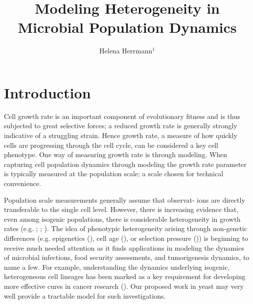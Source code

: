 \documentclass{bioinfo}
\begin{document}

\title[Project Proposal]{\Large{Modeling Heterogeneity in Microbial Population Dynamics}}
\author[Helena Herrmann]{Helena Herrmann$^{1}$}
\address{$^{1}$School of Computing Science, Newcastle University, UK}

\vspace{-3em}
\maketitle

\section{Introduction}

Cell growth rate is an important component of evolutionary fitness and is thus subjected to great selective forces; a reduced growth rate is generally strongly indicative of a struggling strain. Hence growth rate, a measure of how quickly cells are progressing through the cell cycle, can be considered a key cell phenotype. One way of measuring growth rate is through modeling. When capturing cell population dynamics through modeling the growth rate parameter is typically measured at the population scale; a scale chosen for technical convenience. 

Population scale measurements generally assume that observat- ions are directly transferable to the single cell level. However, there is increasing evidence that, even among isogenic populations, there is considerable heterogeneity in growth rates (e.g. \citealp{Pin06}; \citealp{Schmidt12}; \citealp{Levy12}). The idea of phenotypic heterogeneity arising through non-genetic differences (e.g. epigenetics (\citealp{Bird07}), cell age (\citealp{Ginovart11}), or selection pressure (\citealp{Navin11})) is beginning to receive much needed attention as it finds applications in modeling the dynamics of microbial infections, food security assessments, and tumorigenesis dynamics, to name a few.  For example, understanding the dynamics underlying isogenic, heterogeneous cell lineages has been marked as a key requirement for developing more effective cures in cancer research (\citealp{Tabassum15}). Our proposed work in yeast may very well provide a tractable model for such investigations. 
\end{document}
